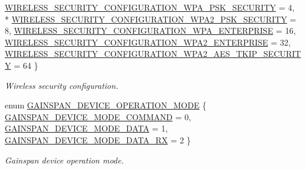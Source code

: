 \begin{DoxyCompactItemize}
\hyperlink{group__wireless__interface_ggab937e212876c914a187986c349918053af77afdd18bbeb51e8a4bc25edfe0ec8a}{W\+I\+R\+E\+L\+E\+S\+S\+\_\+\+S\+E\+C\+U\+R\+I\+T\+Y\+\_\+\+C\+O\+N\+F\+I\+G\+U\+R\+A\+T\+I\+O\+N\+\_\+\+W\+P\+A\+\_\+\+P\+S\+K\+\_\+\+S\+E\+C\+U\+R\+I\+TY} = 4, 
\\*
\hyperlink{group__wireless__interface_ggab937e212876c914a187986c349918053a2384604a08f67cd8384ed56e3849fcb3}{W\+I\+R\+E\+L\+E\+S\+S\+\_\+\+S\+E\+C\+U\+R\+I\+T\+Y\+\_\+\+C\+O\+N\+F\+I\+G\+U\+R\+A\+T\+I\+O\+N\+\_\+\+W\+P\+A2\+\_\+\+P\+S\+K\+\_\+\+S\+E\+C\+U\+R\+I\+TY} = 8, 
\hyperlink{group__wireless__interface_ggab937e212876c914a187986c349918053a197f51cfbbe29a7647847db1dbc03c84}{W\+I\+R\+E\+L\+E\+S\+S\+\_\+\+S\+E\+C\+U\+R\+I\+T\+Y\+\_\+\+C\+O\+N\+F\+I\+G\+U\+R\+A\+T\+I\+O\+N\+\_\+\+W\+P\+A\+\_\+\+E\+N\+T\+E\+R\+P\+R\+I\+SE} = 16, 
\hyperlink{group__wireless__interface_ggab937e212876c914a187986c349918053a7405847cdebd9bbe5ee368654f355b76}{W\+I\+R\+E\+L\+E\+S\+S\+\_\+\+S\+E\+C\+U\+R\+I\+T\+Y\+\_\+\+C\+O\+N\+F\+I\+G\+U\+R\+A\+T\+I\+O\+N\+\_\+\+W\+P\+A2\+\_\+\+E\+N\+T\+E\+R\+P\+R\+I\+SE} = 32, 
\hyperlink{group__wireless__interface_ggab937e212876c914a187986c349918053aa8b9524d56d138bf9b8c819eb8428983}{W\+I\+R\+E\+L\+E\+S\+S\+\_\+\+S\+E\+C\+U\+R\+I\+T\+Y\+\_\+\+C\+O\+N\+F\+I\+G\+U\+R\+A\+T\+I\+O\+N\+\_\+\+W\+P\+A2\+\_\+\+A\+E\+S\+\_\+\+T\+K\+I\+P\+\_\+\+S\+E\+C\+U\+R\+I\+TY} = 64
 \}\begin{DoxyCompactList}\small\item\em Wireless security configuration. \end{DoxyCompactList}
\item 
enum \hyperlink{group__wireless__interface_gab3f544ed880ca96513a544cc83b36dc1}{G\+A\+I\+N\+S\+P\+A\+N\+\_\+\+D\+E\+V\+I\+C\+E\+\_\+\+O\+P\+E\+R\+A\+T\+I\+O\+N\+\_\+\+M\+O\+DE} \{ \hyperlink{group__wireless__interface_ggab3f544ed880ca96513a544cc83b36dc1af3dbf03c29f3997d26e2498cd6d27f59}{G\+A\+I\+N\+S\+P\+A\+N\+\_\+\+D\+E\+V\+I\+C\+E\+\_\+\+M\+O\+D\+E\+\_\+\+C\+O\+M\+M\+A\+ND} = 0, 
\hyperlink{group__wireless__interface_ggab3f544ed880ca96513a544cc83b36dc1aa12a645c46b95f7d32279ed56fa94d0f}{G\+A\+I\+N\+S\+P\+A\+N\+\_\+\+D\+E\+V\+I\+C\+E\+\_\+\+M\+O\+D\+E\+\_\+\+D\+A\+TA} = 1, 
\hyperlink{group__wireless__interface_ggab3f544ed880ca96513a544cc83b36dc1a7b28d347d7d9a4d7dacac916c948e48b}{G\+A\+I\+N\+S\+P\+A\+N\+\_\+\+D\+E\+V\+I\+C\+E\+\_\+\+M\+O\+D\+E\+\_\+\+D\+A\+T\+A\+\_\+\+RX} = 2
 \}\begin{DoxyCompactList}\small\item\em Gainspan device operation mode. \end{DoxyCompactList}

\end{DoxyCompactItemize}
